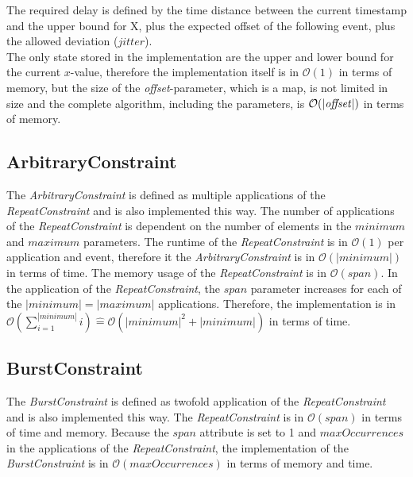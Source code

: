 	The required delay is defined by the time distance between the current timestamp and the upper bound for X, plus the expected offset of the following event, plus the allowed deviation ($jitter$).\\
	The only state stored in the implementation are the upper and lower bound for the  current $x$-value, therefore the implementation itself is in $\mathcal{O}(1)$ in terms of memory, but the size of the \textit{offset}-parameter, which is a map, is not limited in size and the complete algorithm, including the parameters, is $\mathcal{O}(|\text{\textit{offset}}|)$ in terms of memory.
	
\subsection{ArbitraryConstraint}
	The \emph{ArbitraryConstraint} is defined as multiple applications of the \emph{RepeatConstraint} and is also implemented this way. The number of applications of the \emph{RepeatConstraint} is dependent on the number of elements in the $minimum$ and $maximum$ parameters. The runtime of the \emph{RepeatConstraint} is in $\mathcal{O}(1)$ per application and event, therefore it the \emph{ArbitraryConstraint} is in $\mathcal{O}(|minimum|)$ in terms of time. The memory usage of the \emph{RepeatConstraint} is in $\mathcal{O}(span)$. In the application of the \emph{RepeatConstraint}, the $span$ parameter increases for each of the $|minimum| = |maximum|$ applications. Therefore, the implementation is in $\mathcal{O}(\sum_{i=1}^{|minimum|}i)\widehat{=}\mathcal{O}(|minimum|^2+|minimum|)$ in terms of time.

\subsection{BurstConstraint}
	The \textit{BurstConstraint} is defined as twofold application of the \emph{RepeatConstraint} and is also implemented this way. The \textit{RepeatConstraint} is in $\mathcal{O}(span)$ in terms of time and memory. Because the $span$ attribute is set to 1 and $maxOccurrences$ in the applications of the \textit{RepeatConstraint}, the implementation of the \emph{BurstConstraint} is in $\mathcal{O}(maxOccurrences)$ in terms of memory and time.

